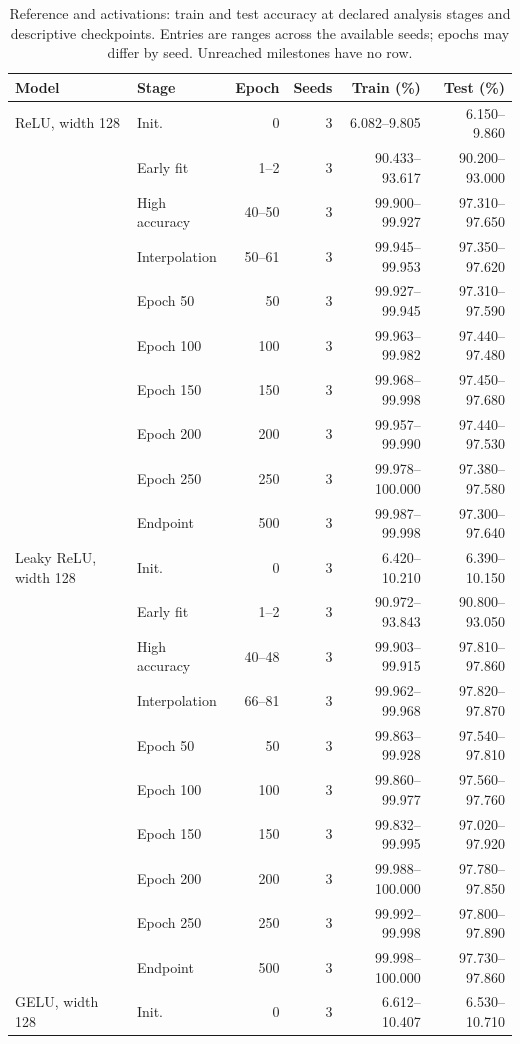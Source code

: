 \begin{table}[!htbp]\centering
\caption{Reference and activations: train and test accuracy at declared analysis stages and descriptive checkpoints. Entries are ranges across the available seeds; epochs may differ by seed. Unreached milestones have no row.}\label{tab:perf-0-0}
\small\setlength{\tabcolsep}{4pt}
\begin{tabular}{llrrrr}\toprule
Model & Stage & Epoch & Seeds & Train (\%) & Test (\%)\\\midrule
ReLU, width 128 & Init. & 0 & 3 & 6.082--9.805 & 6.150--9.860\\
 & Early fit & 1--2 & 3 & 90.433--93.617 & 90.200--93.000\\
 & High accuracy & 40--50 & 3 & 99.900--99.927 & 97.310--97.650\\
 & Interpolation & 50--61 & 3 & 99.945--99.953 & 97.350--97.620\\
 & Epoch 50 & 50 & 3 & 99.927--99.945 & 97.310--97.590\\
 & Epoch 100 & 100 & 3 & 99.963--99.982 & 97.440--97.480\\
 & Epoch 150 & 150 & 3 & 99.968--99.998 & 97.450--97.680\\
 & Epoch 200 & 200 & 3 & 99.957--99.990 & 97.440--97.530\\
 & Epoch 250 & 250 & 3 & 99.978--100.000 & 97.380--97.580\\
 & Endpoint & 500 & 3 & 99.987--99.998 & 97.300--97.640\\
\midrule
Leaky ReLU, width 128 & Init. & 0 & 3 & 6.420--10.210 & 6.390--10.150\\
 & Early fit & 1--2 & 3 & 90.972--93.843 & 90.800--93.050\\
 & High accuracy & 40--48 & 3 & 99.903--99.915 & 97.810--97.860\\
 & Interpolation & 66--81 & 3 & 99.962--99.968 & 97.820--97.870\\
 & Epoch 50 & 50 & 3 & 99.863--99.928 & 97.540--97.810\\
 & Epoch 100 & 100 & 3 & 99.860--99.977 & 97.560--97.760\\
 & Epoch 150 & 150 & 3 & 99.832--99.995 & 97.020--97.920\\
 & Epoch 200 & 200 & 3 & 99.988--100.000 & 97.780--97.850\\
 & Epoch 250 & 250 & 3 & 99.992--99.998 & 97.800--97.890\\
 & Endpoint & 500 & 3 & 99.998--100.000 & 97.730--97.860\\
\midrule
GELU, width 128 & Init. & 0 & 3 & 6.612--10.407 & 6.530--10.710\\

\end{tabular}
\end{table}

